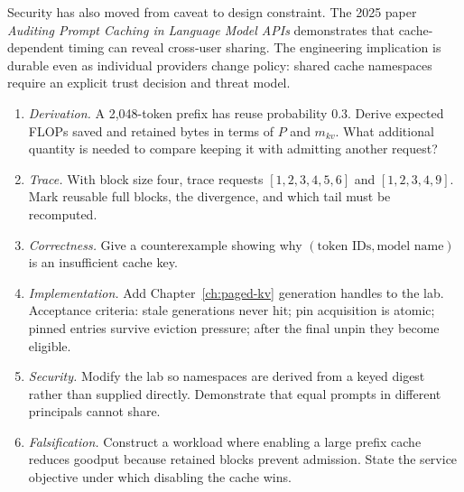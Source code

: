 Security has also moved from caveat to design constraint. The 2025 paper
\emph{Auditing Prompt Caching in Language Model APIs} demonstrates that cache-dependent
timing can reveal cross-user sharing. The engineering implication is durable even as
individual providers change policy: shared cache namespaces require an explicit trust
decision and threat model.

\ExercisesSection
\begin{enumerate}
\item \emph{Derivation.} A 2,048-token prefix has reuse probability 0.3. Derive
expected FLOPs saved and retained bytes in terms of $P$ and $m_{kv}$. What additional
quantity is needed to compare keeping it with admitting another request?
\item \emph{Trace.} With block size four, trace requests
$[1,2,3,4,5,6]$ and $[1,2,3,4,9]$. Mark reusable full blocks, the divergence, and
which tail must be recomputed.
\item \emph{Correctness.} Give a counterexample showing why
$(\text{token IDs},\text{model name})$ is an insufficient cache key.
\item \emph{Implementation.} Add Chapter~\ref{ch:paged-kv} generation handles to the
lab. Acceptance criteria: stale generations never hit; pin acquisition is atomic;
pinned entries survive eviction pressure; after the final unpin they become eligible.
\item \emph{Security.} Modify the lab so namespaces are derived from a keyed digest
rather than supplied directly. Demonstrate that equal prompts in different principals
cannot share.
\item \emph{Falsification.} Construct a workload where enabling a large prefix cache
reduces goodput because retained blocks prevent admission. State the service objective
under which disabling the cache wins.
\end{enumerate}


